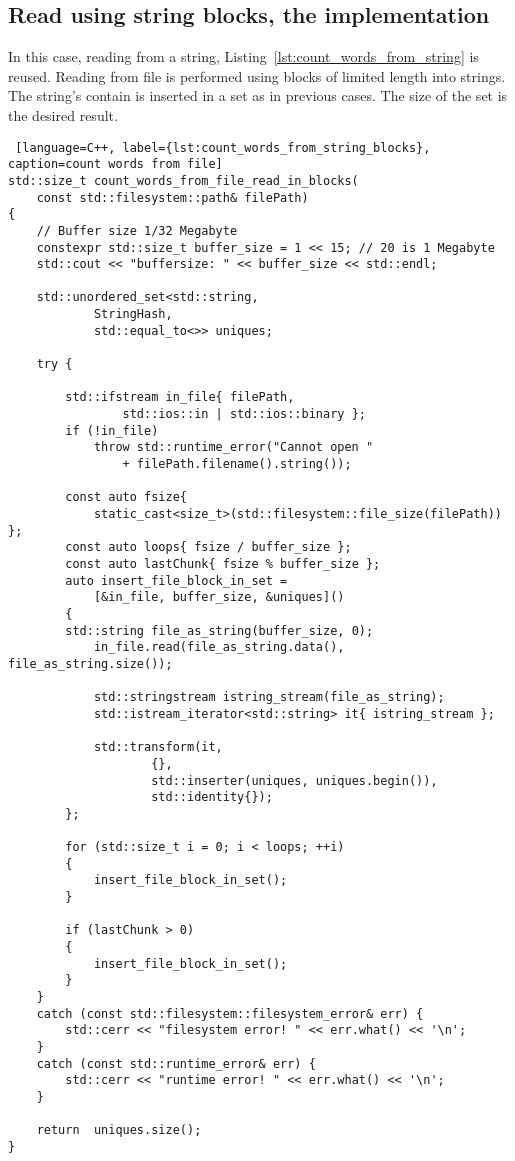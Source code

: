 \documentclass{article}
\begin{document}
\subsection{Read using string blocks, the implementation}

In this case, reading from a string, Listing~\ref{lst:count_words_from_string} is reused. Reading from file is performed using blocks of limited length into strings. The string's contain is inserted in a set as in previous cases. The size of the set is the desired result.

\begin{lstlisting} [language=C++, label={lst:count_words_from_string_blocks}, caption=count words from file]
std::size_t count_words_from_file_read_in_blocks(
	const std::filesystem::path& filePath)
{
    // Buffer size 1/32 Megabyte
    constexpr std::size_t buffer_size = 1 << 15; // 20 is 1 Megabyte
    std::cout << "buffersize: " << buffer_size << std::endl;

    std::unordered_set<std::string, 
    		StringHash, 
    		std::equal_to<>> uniques;
 
    try {
        
        std::ifstream in_file{ filePath, 
        		std::ios::in | std::ios::binary };
        if (!in_file)
            throw std::runtime_error("Cannot open " 
            	+ filePath.filename().string());

        const auto fsize{ 
        	static_cast<size_t>(std::filesystem::file_size(filePath)) };
        const auto loops{ fsize / buffer_size };
        const auto lastChunk{ fsize % buffer_size };
        auto insert_file_block_in_set = 
        	[&in_file, buffer_size, &uniques]()
        {
	    std::string file_as_string(buffer_size, 0);	
            in_file.read(file_as_string.data(), file_as_string.size());

            std::stringstream istring_stream(file_as_string);
            std::istream_iterator<std::string> it{ istring_stream };

            std::transform(it, 
            		{}, 
            		std::inserter(uniques, uniques.begin()), 
            		std::identity{});
        };

        for (std::size_t i = 0; i < loops; ++i) 
        {
            insert_file_block_in_set();
        }
        
        if (lastChunk > 0)
        {
            insert_file_block_in_set();
        }
    }
    catch (const std::filesystem::filesystem_error& err) {
        std::cerr << "filesystem error! " << err.what() << '\n';
    }
    catch (const std::runtime_error& err) {
        std::cerr << "runtime error! " << err.what() << '\n';
    }

    return  uniques.size();
}

\end{lstlisting}
\end{document}
